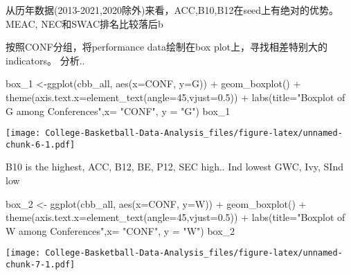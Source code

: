 \documentclass[
]{article}
\newenvironment{Shaded}{\begin{snugshade}}{\end{snugshade}}
\newcommand{\AttributeTok}[1]{\textcolor[rgb]{0.77,0.63,0.00}{#1}}
\newcommand{\DecValTok}[1]{\textcolor[rgb]{0.00,0.00,0.81}{#1}}
\newcommand{\FloatTok}[1]{\textcolor[rgb]{0.00,0.00,0.81}{#1}}
\newcommand{\FunctionTok}[1]{\textcolor[rgb]{0.00,0.00,0.00}{#1}}
\newcommand{\NormalTok}[1]{#1}
\newcommand{\OtherTok}[1]{\textcolor[rgb]{0.56,0.35,0.01}{#1}}
\newcommand{\SpecialCharTok}[1]{\textcolor[rgb]{0.00,0.00,0.00}{#1}}
\newcommand{\StringTok}[1]{\textcolor[rgb]{0.31,0.60,0.02}{#1}}
\begin{document}
从历年数据(2013-2021,2020除外)来看，ACC,B10,B12在seed上有绝对的优势。
MEAC, NEC和SWAC排名比较落后b

按照CONF分组，将performance data绘制在box
plot上，寻找相差特别大的indicators。 分析..

\begin{Shaded}
\begin{Highlighting}[]
\NormalTok{box\_1 }\OtherTok{\textless{}{-}}\FunctionTok{ggplot}\NormalTok{(cbb\_all, }\FunctionTok{aes}\NormalTok{(}\AttributeTok{x=}\NormalTok{CONF, }\AttributeTok{y=}\NormalTok{G)) }\SpecialCharTok{+} \FunctionTok{geom\_boxplot}\NormalTok{() }\SpecialCharTok{+} \FunctionTok{theme}\NormalTok{(}\AttributeTok{axis.text.x=}\FunctionTok{element\_text}\NormalTok{(}\AttributeTok{angle=}\DecValTok{45}\NormalTok{,}\AttributeTok{vjust=}\FloatTok{0.5}\NormalTok{)) }\SpecialCharTok{+} \FunctionTok{labs}\NormalTok{(}\AttributeTok{title=}\StringTok{"Boxplot of G among Conferences"}\NormalTok{,}\AttributeTok{x=} \StringTok{"CONF"}\NormalTok{, }\AttributeTok{y =} \StringTok{"G"}\NormalTok{)}
\NormalTok{box\_1}
\end{Highlighting}
\end{Shaded}

\texttt{[image: College-Basketball-Data-Analysis\_files/figure-latex/unnamed-chunk-6-1.pdf]}

B10 is the highest, ACC, B12, BE, P12, SEC high.. Ind lowest GWC, Ivy,
SInd low

\begin{Shaded}
\begin{Highlighting}[]
\NormalTok{box\_2 }\OtherTok{\textless{}{-}} \FunctionTok{ggplot}\NormalTok{(cbb\_all, }\FunctionTok{aes}\NormalTok{(}\AttributeTok{x=}\NormalTok{CONF, }\AttributeTok{y=}\NormalTok{W)) }\SpecialCharTok{+} \FunctionTok{geom\_boxplot}\NormalTok{() }\SpecialCharTok{+} \FunctionTok{theme}\NormalTok{(}\AttributeTok{axis.text.x=}\FunctionTok{element\_text}\NormalTok{(}\AttributeTok{angle=}\DecValTok{45}\NormalTok{,}\AttributeTok{vjust=}\FloatTok{0.5}\NormalTok{)) }\SpecialCharTok{+} \FunctionTok{labs}\NormalTok{(}\AttributeTok{title=}\StringTok{"Boxplot of W among Conferences"}\NormalTok{,}\AttributeTok{x=} \StringTok{"CONF"}\NormalTok{, }\AttributeTok{y =} \StringTok{"W"}\NormalTok{)}
\NormalTok{box\_2}
\end{Highlighting}
\end{Shaded}

\texttt{[image: College-Basketball-Data-Analysis\_files/figure-latex/unnamed-chunk-7-1.pdf]}
\end{document}
